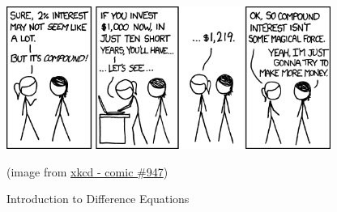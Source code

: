 %
%


\begin{topic}


%
%
%	

\vfil

\begin{center}
\begin{minipage}{300pt}
	\includegraphics*[width=300pt]{images/chap5-xkcd.png}

	\hfill {\footnotesize (image from \href{https://www.xkcd.com/947/}{xkcd - comic \#947})}
\end{minipage}
\end{center}
\end{topic}











%
%



\begin{module}{Introduction to Difference Equations}
	\label{diff:intro}

	
%	
\end{module}



